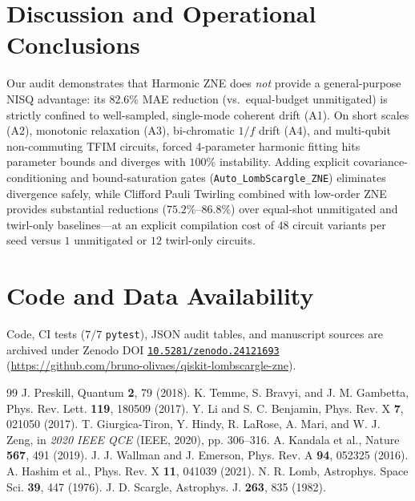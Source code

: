 \documentclass[10pt,twocolumn,a4paper]{article}
\begin{document}
\section{Discussion and Operational Conclusions}
Our audit demonstrates that Harmonic ZNE does \emph{not} provide a general-purpose NISQ advantage: its $82.6\%$ MAE reduction (vs.\ equal-budget unmitigated) is strictly confined to well-sampled, single-mode coherent drift (A1). On short scales (A2), monotonic relaxation (A3), bi-chromatic $1/f$ drift (A4), and multi-qubit non-commuting TFIM circuits, forced 4-parameter harmonic fitting hits parameter bounds and diverges with $100\%$ instability. Adding explicit covariance-conditioning and bound-saturation gates (\texttt{Auto\_LombScargle\_ZNE}) eliminates divergence safely, while Clifford Pauli Twirling combined with low-order ZNE provides substantial reductions ($75.2\%\text{--}86.8\%$) over equal-shot unmitigated and twirl-only baselines—at an explicit compilation cost of $48$ circuit variants per seed versus $1$ unmitigated or $12$ twirl-only circuits.

\section*{Code and Data Availability}
Code, CI tests ($7/7$ \texttt{pytest}), JSON audit tables, and manuscript sources are archived under Zenodo DOI \href{https://doi.org/10.5281/zenodo.24121693}{\texttt{10.5281/zenodo.24121693}} (\url{https://github.com/bruno-olivaes/qiskit-lombscargle-zne}).

\begin{thebibliography}{99}
\footnotesize
\setlength{\itemsep}{0pt}
\setlength{\parskip}{0pt}
J. Preskill, Quantum \textbf{2}, 79 (2018).
K. Temme, S. Bravyi, and J. M. Gambetta, Phys. Rev. Lett. \textbf{119}, 180509 (2017).
Y. Li and S. C. Benjamin, Phys. Rev. X \textbf{7}, 021050 (2017).
T. Giurgica-Tiron, Y. Hindy, R. LaRose, A. Mari, and W. J. Zeng, in \textit{2020 IEEE QCE} (IEEE, 2020), pp. 306--316.
A. Kandala et al., Nature \textbf{567}, 491 (2019).
J. J. Wallman and J. Emerson, Phys. Rev. A \textbf{94}, 052325 (2016).
A. Hashim et al., Phys. Rev. X \textbf{11}, 041039 (2021).
N. R. Lomb, Astrophys. Space Sci. \textbf{39}, 447 (1976).
J. D. Scargle, Astrophys. J. \textbf{263}, 835 (1982).
\end{thebibliography}
\end{document}
